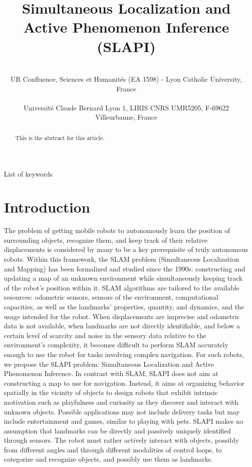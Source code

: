 \documentclass[pmlr]{jmlr}%
\title[SLAPI]{Simultaneous Localization and Active Phenomenon Inference (SLAPI)}
\author{\Name{Olivier L. Georgeon} \Email{ogeorgeon@univ-catholyon.fr}\\
  \addr UR Confluence, Sciences et Humanités (EA 1598) - Lyon Catholic University, France\\
   \Name{Titouan Knockaert} \Email{titouan.knockaert@gmail.com}\\
  \addr Université Claude Bernard Lyon 1, LIRIS CNRS UMR5205, F-69622 Villeurbanne, France
}
\begin{document}
\maketitle

\begin{abstract}
This is the abstract for this article.
\end{abstract}
\begin{keywords}
List of keywords
\end{keywords}

\section{Introduction}
\label{sec:intro}

The problem of getting mobile robots to autonomously learn the position of surrounding objects, recognize them, and keep track of their relative displacements is considered by many to be a key prerequisite of truly autonomous robots. 
Within this framework, the SLAM problem (Simultaneous Localization and Mapping) has been formalized and studied since the 1990s: constructing and updating a map of an unknown environment while simultaneously keeping track of the robot's position within it.
SLAM algorithms are tailored to the available resources: odometric sensors, sensors of the environment, computational capacities, as well as the landmarks' properties, quantity, and dynamics, and the usage intended for the robot.
When displacements are imprecise and odometric data is not available, when landmarks are not directly identifiable, and below a certain level of scarcity and noise in the sensory data relative to the environment’s complexity, it becomes difficult to perform SLAM accurately enough to use the robot for tasks involving complex navigation. 
For such robots, we propose the SLAPI problem:  Simultaneous Localization and Active Phenomenon Inference.
In contrast with SLAM, SLAPI does not aim at constructing a map to use for navigation. 
Instead, it aims at organizing behavior spatially in the vicinity of objects to design robots that exhibit intrinsic motivation such as playfulness and curiosity as they discover and interact with unknown objects. 
Possible applications may not include delivery tasks but may include entertainment and games, similar to playing with pets. 
SLAPI makes no assumption that landmarks can be directly and passively uniquely identified through sensors. 
The robot must rather actively interact with objects, possibly from different angles and through different modalities of control loops, to categorize and recognize objects, and possibly use them as landmarks. 
\end{document}
